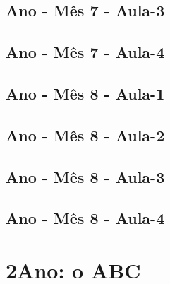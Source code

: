 \begin{multicols}{2}
\section[\sffamily 1\textordmasculine\space Ano - M\^{e}s 7 - Aula-3]{\textordmasculine\space Ano - M\^{e}s 7 - Aula-3}


\section[\sffamily 1\textordmasculine\space Ano - M\^{e}s 7 - Aula-4]{\textordmasculine\space Ano - M\^{e}s 7 - Aula-4}


\section[\sffamily 1\textordmasculine\space Ano - M\^{e}s 8 - Aula-1]{\textordmasculine\space Ano - M\^{e}s 8 - Aula-1}


\section[\sffamily 1\textordmasculine\space Ano - M\^{e}s 8 - Aula-2]{\textordmasculine\space Ano - M\^{e}s 8 - Aula-2}


\section[\sffamily 1\textordmasculine\space Ano - M\^{e}s 8 - Aula-3]{\textordmasculine\space Ano - M\^{e}s 8 - Aula-3}


\section[\sffamily 1\textordmasculine\space Ano - M\^{e}s 8 - Aula-4]{\textordmasculine\space Ano - M\^{e}s 8 - Aula-4}

\end{multicols}



	\chapter[ 2\textordmasculine\space Ano: o ABC]{2\textordmasculine\space Ano: o ABC}

